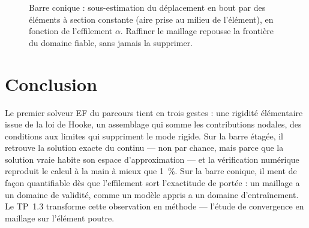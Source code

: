 \documentclass[10pt,journal]{IEEEtran}
\begin{document}
\begin{figure}[!t]
\centering
{}
\caption{Barre conique : sous-estimation du déplacement en bout par des éléments à section constante (aire prise au milieu de l'élément), en fonction de l'effilement $\alpha$. Raffiner le maillage repousse la frontière du domaine fiable, sans jamais la supprimer.}
\label{fig:domaine}
\end{figure}

\section{Conclusion}
Le premier solveur EF du parcours tient en trois gestes : une rigidité élémentaire issue de la loi de Hooke, un assemblage qui somme les contributions nodales, des conditions aux limites qui suppriment le mode rigide. Sur la barre étagée, il retrouve la solution exacte du continu --- non par chance, mais parce que la solution vraie habite son espace d'approximation --- et la vérification numérique reproduit le calcul à la main à mieux que 1~\%. Sur la barre conique, il ment de façon quantifiable dès que l'effilement sort l'exactitude de portée : un maillage a un domaine de validité, comme un modèle appris a un domaine d'entraînement. Le TP~1.3 transforme cette observation en méthode --- l'étude de convergence en maillage sur l'élément poutre.
\end{document}
